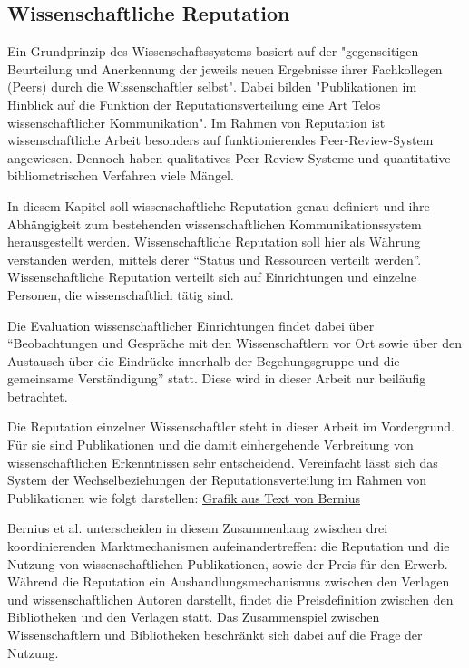 \subsection{Wissenschaftliche Reputation}
Ein Grundprinzip des Wissenschaftssystems basiert auf der "gegenseitigen Beurteilung und Anerkennung der jeweils neuen Ergebnisse ihrer Fachkollegen (Peers) durch die Wissenschaftler selbst"\cite{Hanekop_2014}. Dabei bilden "Publikationen im Hinblick auf die Funktion der Reputationsverteilung eine Art Telos wissenschaftlicher Kommunikation"\cite{hirschauer2004peer}. Im Rahmen von Reputation ist wissenschaftliche Arbeit besonders auf funktionierendes Peer-Review-System angewiesen\cite{suchen}. Dennoch haben qualitatives Peer Review-Systeme und quantitative bibliometrischen Verfahren viele Mängel\cite{osterloh2008anreize}.

In diesem Kapitel soll wissenschaftliche Reputation genau definiert und ihre Abhängigkeit zum bestehenden wissenschaftlichen Kommunikationssystem herausgestellt werden. Wissenschaftliche Reputation soll hier als Währung verstanden werden, mittels derer “Status und Ressourcen verteilt werden”\cite{hanekop_2006}. Wissenschaftliche Reputation verteilt sich auf Einrichtungen und einzelne Personen, die wissenschaftlich tätig sind\cite{suchen}. 

Die Evaluation wissenschaftlicher Einrichtungen findet dabei über “Beobachtungen und Gespräche mit den Wissenschaftlern vor Ort sowie über den Austausch über die Eindrücke innerhalb der Begehungsgruppe und die gemeinsame Verständigung”\cite{Barl_sius_2008} statt. Diese wird in dieser Arbeit nur beiläufig betrachtet.

Die Reputation einzelner Wissenschaftler steht in dieser Arbeit im Vordergrund. Für sie sind Publikationen und die damit einhergehende Verbreitung von wissenschaftlichen Erkenntnissen sehr entscheidend\cite{suchen}. Vereinfacht lässt sich das System der Wechselbeziehungen der Reputationsverteilung im Rahmen von Publikationen wie folgt darstellen\cite{cite:21a}: \href{http://www.eap-journal.com/archive/v39_i1_8_bernius.pdf}{Grafik aus Text von Bernius}

Bernius et al. unterscheiden in diesem Zusammenhang zwischen drei koordinierenden Marktmechanismen aufeinandertreffen: die Reputation und die Nutzung von wissenschaftlichen Publikationen, sowie der Preis für den Erwerb. Während die Reputation ein Aushandlungsmechanismus zwischen den Verlagen und wissenschaftlichen Autoren darstellt, findet die Preisdefinition zwischen den Bibliotheken und den Verlagen statt. Das Zusammenspiel zwischen Wissenschaftlern und Bibliotheken beschränkt sich dabei auf die Frage der Nutzung.\cite{cite:21a}

